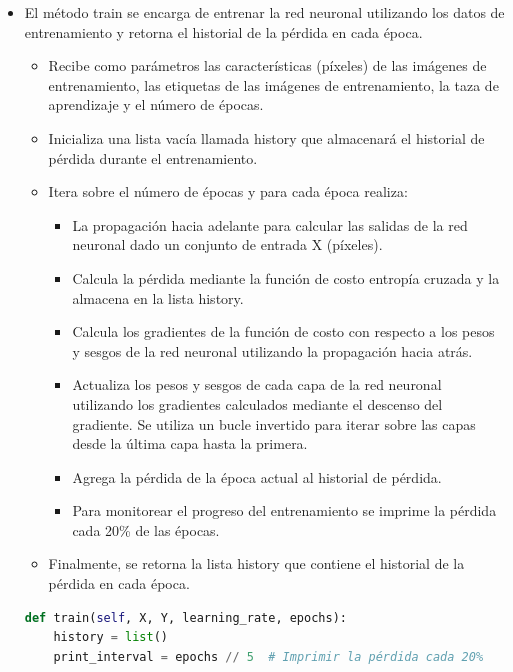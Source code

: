 \documentclass{article}
\begin{document}
\begin{itemize}
        \item El método train se encarga de entrenar la red neuronal utilizando los datos de entrenamiento y retorna el historial de la pérdida en cada época.
        \begin{itemize}
            \item Recibe como parámetros las características (píxeles) de las imágenes de entrenamiento,
            las etiquetas de las imágenes de entrenamiento, la taza de aprendizaje y el número de épocas.
            \item Inicializa una lista vacía llamada history que almacenará el historial de pérdida durante el entrenamiento.
            \item Itera sobre el número de épocas y para cada época realiza:
            \begin{itemize}
                \item La propagación hacia adelante
                para calcular las salidas de la red neuronal dado un conjunto de entrada X (píxeles).
                \item Calcula la pérdida mediante la función de costo entropía cruzada y la almacena en la lista history.
                \item Calcula los gradientes de la función de costo con respecto a los pesos y sesgos de la red neuronal utilizando la propagación hacia atrás.
                \item Actualiza los pesos y sesgos de cada capa de la red neuronal utilizando los gradientes calculados mediante el descenso del gradiente.
                Se utiliza un bucle invertido para iterar sobre las capas desde la última capa hasta la primera.
                \item Agrega la pérdida de la época actual al historial de pérdida.
                \item Para monitorear el progreso del entrenamiento se imprime la pérdida cada 20\% de las épocas.
            \end{itemize}
            \item Finalmente, se retorna la lista history que contiene el historial de la pérdida en cada época.

        \end{itemize}
        \begin{lstlisting}[language=Python, caption={Entrenamiento de la red neuronal}, label={lst:train_network}]
def train(self, X, Y, learning_rate, epochs):
    history = list()
    print_interval = epochs // 5  # Imprimir la pérdida cada 20%


\end{lstlisting}
\end{itemize}
\end{document}
